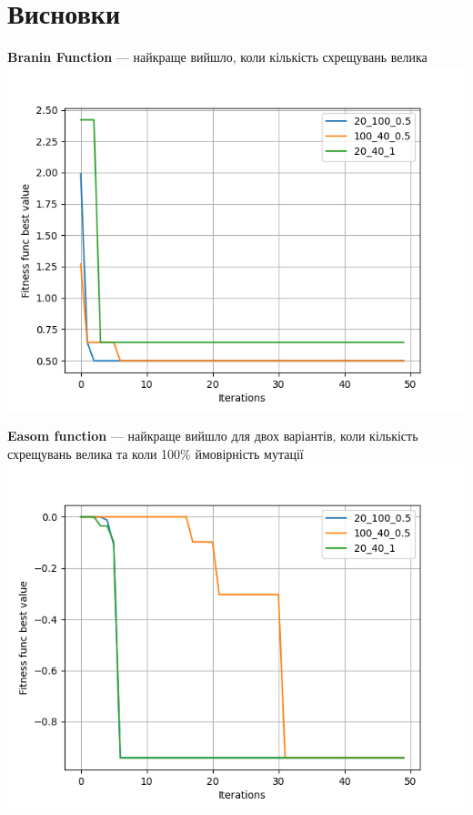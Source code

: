 \documentclass{article}
\begin{document}
    \newpage
    \section{Висновки}
        \textbf{Branin Function} --- найкраще вийшло, коли кількість схрещувань велика \\
        \includegraphics{Branin Function.png}
        
        \newpage

        \textbf{Easom function} --- найкраще вийшло для двох варіантів, коли кількість схрещувань велика та коли 100\% ймовірність мутації \\
        \includegraphics{Easom function.png}
        
\end{document}
